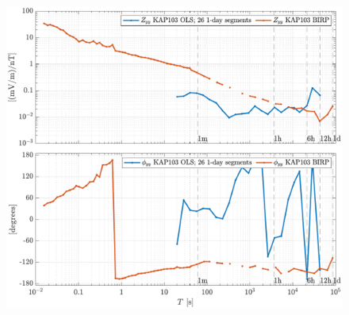 \documentclass{article}
\begin{document}
\begin{figure}[h!]
\centering
\includegraphics[width=\textwidth]{figures/KAP103/transferfnZ_compare-Z_yy_Magnitude_Phase.pdf}
\caption{}
\label{fig:universe}
\end{figure}

\clearpage
\end{document}
